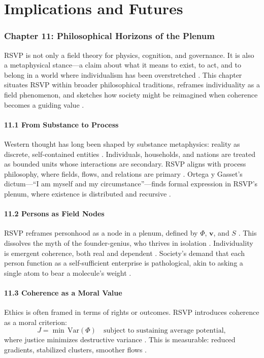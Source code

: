 \documentclass[12pt]{article}
\begin{document}
\part{Implications and Futures}
\section*{Chapter 11: Philosophical Horizons of the Plenum}
RSVP is not only a field theory for physics, cognition, and governance. It is also a metaphysical stance---a claim about what it means to exist, to act, and to belong in a world where individualism has been overstretched \citep{ortega1957}. This chapter situates RSVP within broader philosophical traditions, reframes individuality as a field phenomenon, and sketches how society might be reimagined when coherence becomes a guiding value \citep{whitehead1978}.
\subsection*{11.1 From Substance to Process}
Western thought has long been shaped by substance metaphysics: reality as discrete, self-contained entities \citep{whitehead1978}. Individuals, households, and nations are treated as bounded units whose interactions are secondary. RSVP aligns with process philosophy, where fields, flows, and relations are primary \citep{deleuze1987}. Ortega y Gasset's dictum---``I am myself and my circumstance''---finds formal expression in RSVP's plenum, where existence is distributed and recursive \citep{ortega1957}.
\subsection*{11.2 Persons as Field Nodes}
RSVP reframes personhood as a node in a plenum, defined by \(\Phi\), \(\mathbf{v}\), and \(S\) \citep{gromov1999}. This dissolves the myth of the founder-genius, who thrives in isolation \citep{zuboff2019}. Individuality is emergent coherence, both real and dependent \citep{whitehead1978}. Society's demand that each person function as a self-sufficient enterprise is pathological, akin to asking a single atom to bear a molecule's weight \citep{deleuze1987}.
\subsection*{11.3 Coherence as a Moral Value}
Ethics is often framed in terms of rights or outcomes. RSVP introduces coherence as a moral criterion:
\[
J = \min \, \mathrm{Var}(\Phi) \quad \text{subject to sustaining average potential},
\]
where justice minimizes destructive variance \citep{whitehead1978}. This is measurable: reduced gradients, stabilized clusters, smoother flows \citep{gromov1999}.
\end{document}
